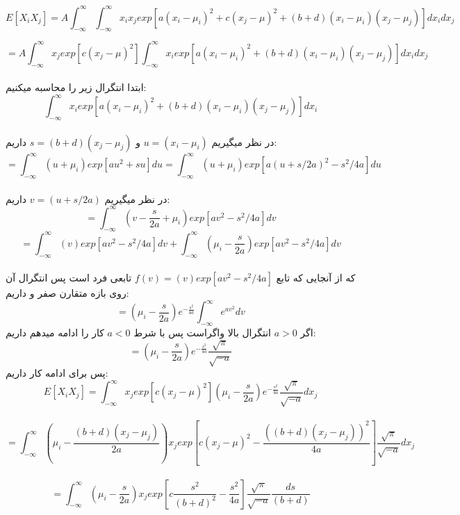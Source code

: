 \[
    E[X_i X_j] = A\int_{-\infty}^{\infty}{\int_{-\infty}^{\infty}
    {x_i x_jexp[a(x_i-\mu_i)^2+c(x_j-\mu)^2+(b+d)(x_i-\mu_i)(x_j-\mu_j)]}}
    dx_i dx_j 
\]

\[
    = A\int_{-\infty}^{\infty}{x_j exp[c(x_j-\mu)^2]\int_{-\infty}^{\infty}
    {x_i exp[a(x_i-\mu_i)^2+(b+d)(x_i-\mu_i)(x_j-\mu_j)]}}
    dx_i dx_j 
\]\\
ابتدا انتگرال زیر را محاسبه میکنیم:\\

\[
    \int_{-\infty}^{\infty}
    {x_i exp[a(x_i-\mu_i)^2+(b+d)(x_i-\mu_i)(x_j-\mu_j)]}
    dx_i
\]\\
در نظر میگیریم $u=(x_i-\mu_i)$ و $s = (b+d)(x_j-\mu_j)$
داریم:\\
\[
    = \int_{-\infty}^{\infty}
    {(u+\mu_i) exp[au^2+su]}
    du
    = \int_{-\infty}^{\infty}
    {(u+\mu_i) exp[a(u+s/2a)^2-s^2/4a]}
    du
\]\\
در نظر میگیریم $v=(u+s/2a)$
داریم:\\

\[
    = \int_{-\infty}^{\infty}
    {(v-\frac{s}{2a}+\mu_i) exp[av^2-s^2/4a]}
    dv
\]
\[
    = \int_{-\infty}^{\infty}
    {(v)exp[av^2-s^2/4a]}
    dv
    +
    \int_{-\infty}^{\infty}
    {(\mu_i-\frac{s}{2a}) exp[av^2-s^2/4a]}
    dv
\]\\
که از آنجایی که تابع $f(v) = (v)exp[av^2-s^2/4a]$
تابعی فرد است پس انتگرال آن روی بازه متقارن صفر و داریم:\\
\[
    = (\mu_i-\frac{s}{2a})e^{-\frac{s^2}{4a}}
    \int_{-\infty}^{\infty}
    { e^{av^2}}
    dv  
\]
اگر $a>0$ انتگرال بالا واگراست پس با شرط $a<0$ کار را ادامه میدهم داریم:\\
\[
    = (\mu_i-\frac{s}{2a})e^{-\frac{s^2}{4a}}
    \frac{\sqrt{\pi}}{\sqrt{-a}}
\]
پس برای ادامه کار داریم:\\
\[
    E[X_i X_j] = \int_{-\infty}^{\infty}{x_j exp[c(x_j-\mu)^2] (\mu_i-\frac{s}{2a})e^{-\frac{s^2}{4a}}
    \frac{\sqrt{\pi}}{\sqrt{-a}}}
    dx_j
\]\\
\[
    = \int_{-\infty}^{\infty} (\mu_i-\frac{(b+d)(x_j-\mu_j)}{2a}) {x_j exp[c(x_j-\mu)^2-\frac{((b+d)(x_j-\mu_j))^2}{4a}]
    \frac{\sqrt{\pi}}{\sqrt{-a}}}
    dx_j
\]\\
\[
    = \int_{-\infty}^{\infty} (\mu_i-\frac{s}{2a}) {x_j exp[c\frac{s^2}{(b+d)^2}-\frac{s^2}{4a}]
    \frac{\sqrt{\pi}}{\sqrt{-a}}}
    \frac{ds}{(b+d)}
\]
\\\\
